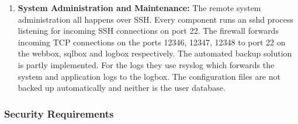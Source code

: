 \documentclass[english]{article}
\begin{document}
\begin{enumerate}
\item \textbf{System Administration and Maintenance:}
The remote system administration all happens over SSH. Every component runs an sshd process listening for incoming SSH connections on port 22. The firewall forwards incoming TCP connections on the ports 12346, 12347, 12348 to port 22 on the webbox, sqlbox and logbox respectively. The automated backup solution is partly implemented. For the logs they use rsyslog which forwards the system and application logs to the logbox. The configuration files are not backed up automatically and neither is the user database.


\end{enumerate}
\subsubsection{Security Requirements}\label{sec_req} %
\end{document}
